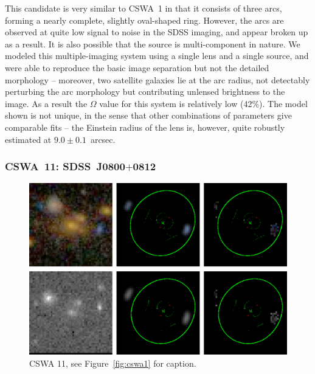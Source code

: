 \documentclass[iop]{emulateapj}
\begin{document}
This candidate is very similar to CSWA~1 in that it consists of three arcs,
forming a nearly complete, slightly oval-shaped ring. However, the arcs are
observed at quite low signal to noise in the SDSS imaging, and appear broken up
as a result. It is also possible that the source is multi-component in nature. 
We modeled this multiple-imaging  system using a single lens and a single
source, and were able to reproduce the basic image separation but not the
detailed morphology -- moreover, two satellite galaxies lie at the arc radius,
not detectably perturbing the arc morphology but contributing unlensed
brightness to the image. As a result the $\Omega$ value for this system is
relatively low (42\%). The model shown is not unique, in the sense that other
combinations of parameters give comparable fits -- the Einstein radius of the
lens is, however, quite robustly estimated at $9.0\pm0.1$~arcsec.



\subsubsection*{CSWA~11: SDSS\ J0800$+$0812}
\label{sec:results:indinotes:cswa11}


\begin{figure}[!ht]
	\centering\includegraphics[width=\linewidth]{figs/11.eps}
	\caption{CSWA 11, see Figure~\ref{fig:cswa1} for caption.}
	\label{fig:cswa11}
\end{figure}
\end{document}
